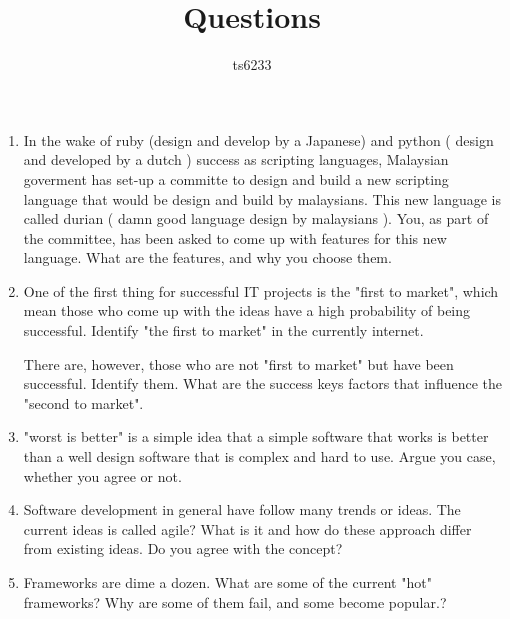 \documentclass[12pt]{article}
\title{Questions}
\author{ts6233}
\date{}
\begin{document}
\begin{enumerate}
\item In the wake of ruby (design and develop by a Japanese) and python ( design and developed by a dutch ) success as scripting languages, Malaysian goverment has set-up a committe to design and build a new scripting language that would be design and build by malaysians. This new language is called durian ( damn good language design by malaysians ). You, as part of the committee, has been asked to come up with features for this new language. What are the features, and why you choose them.

\item One of the first thing for successful IT projects is the "first to market", which mean those who come up with the ideas have a high probability of being successful. Identify "the first to market" in the currently internet.

There are, however, those who are not "first to market" but have been successful. Identify them.
What are the success keys factors that influence the "second to market".

\item "worst is better" is a simple idea that a simple software that works is better than a well design software  that is complex and hard to use. Argue you case, whether you agree or not.

\item Software development in general have follow many trends or ideas. The current ideas is called agile? What is it and how do these approach differ from existing ideas. Do you agree with the concept?


\item Frameworks are dime a dozen. What are some of the current "hot" frameworks?  Why are some of them fail, and some become popular.?

\end{enumerate}
\end{document}
